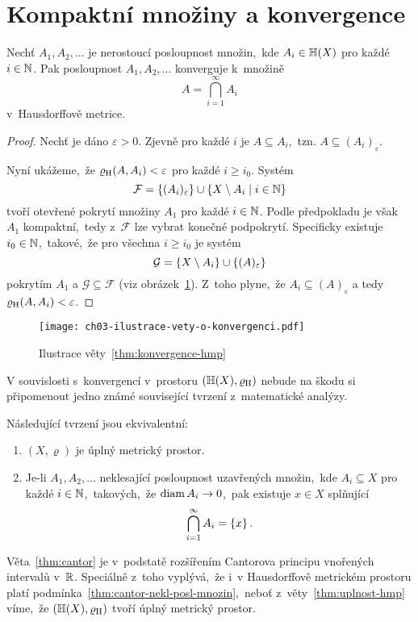 \section{Kompaktní množiny a konvergence}\label{sec:konvergence-hmp}

\begin{theorem}\label{thm:konvergence-hmp}
    Nechť $A_1,A_2,\ldots$ je nerostoucí posloupnost množin,~kde $A_i\in\mathbb{H}(X)$ pro každé $i\in\mathbb{N}$. Pak posloupnost $A_1,A_2,\ldots$ konverguje k~množině
    \[A=\bigcap_{i=1}^\infty A_i\]
    v~Hausdorffově metrice.
\end{theorem}
\begin{proof}
    Nechť je dáno $\varepsilon>0$. Zjevně pro každé $i$ je $A\subseteq A_i$,~tzn. $A\subseteq(A_i)_\varepsilon$.
    
    Nyní ukážeme,~že $\varrho_\textup{H}(A,A_i)<\varepsilon$ pro každé $i\geqslant i_0$. Systém
    \[\mathcal{F}=\left\{(A_i)_\varepsilon\right\}\cup\left\{X\setminus A_i\mid i\in\mathbb{N}\right\}\]
    tvoří otevřené pokrytí množiny $A_1$ pro každé $i\in\mathbb{N}$. Podle předpokladu je však $A_1$ kompaktní,~tedy z~$\mathcal{F}$ lze vybrat konečné podpokrytí. Specificky existuje $i_0\in\mathbb{N}$,~takové,~že pro všechna $i\geqslant i_0$ je systém
    \[\mathcal{G}=\left\{X\setminus A_i\right\}\cup\left\{(A)_\varepsilon\right\}\]
    pokrytím $A_1$ a $\mathcal{G}\subseteq\mathcal{F}$ (viz obrázek~\ref{fig:konvergence-hmp}). Z~toho plyne,~že $A_i\subseteq (A)_\varepsilon$ a tedy $\varrho_\textup{H}(A,A_i)<\varepsilon$.
\end{proof}
\begin{figure}[h]
    \centering
    \texttt{[image: ch03-ilustrace-vety-o-konvergenci.pdf]}
    \caption{Ilustrace věty~\ref{thm:konvergence-hmp}}
    \label{fig:konvergence-hmp}
\end{figure}

V souvislosti s~konvergencí v~prostoru $(\mathbb{H}(X),\varrho_\textup{H})$ nebude na škodu si připomenout jedno známé související tvrzení z~matematické analýzy.
\begin{theorem}\label{thm:cantor}
    Následující tvrzení jsou ekvivalentní:
    \begin{enumerate}[label=(\roman*)]
        \item\label{thm:cantor-uplnost} $(X,\varrho)$ je úplný metrický prostor.
        \item\label{thm:cantor-nekl-posl-mnozin} Je-li $A_1,A_2,\ldots$ neklesající posloupnost uzavřených množin,~kde $A_i\subseteq X$ pro každé $i\in\mathbb{N}$,~takových,~že $\operatorname{diam}{A_i}\to 0$,~pak existuje $x\in X$ splňující
        \[\bigcap_{i=1}^\infty A_i=\left\{x\right\}.\]
    \end{enumerate}
\end{theorem}
Věta~\ref{thm:cantor} je v~podstatě rozšířením Cantorova principu vnořených intervalů v~$\mathbb{R}$. Speciálně z~toho vyplývá,~že i~v Hausdorffově metrickém prostoru platí podmínka~\ref{thm:cantor-nekl-posl-mnozin},~neboť z~věty~\ref{thm:uplnost-hmp} víme,~že $(\mathbb{H}(X),\varrho_\textup{H})$ tvoří úplný metrický prostor.

